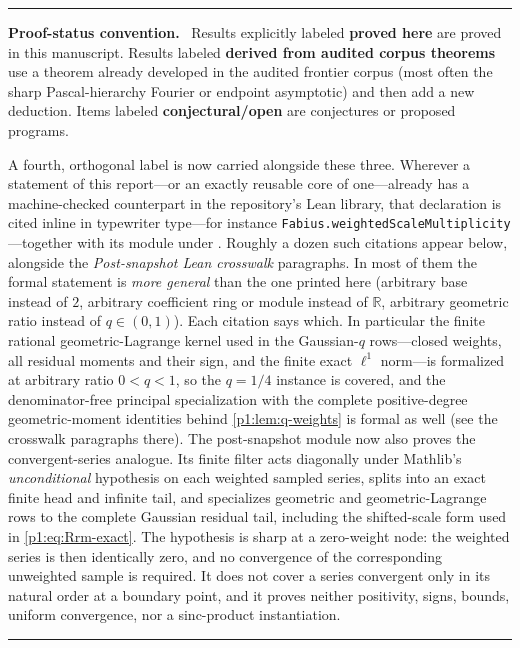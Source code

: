 \documentclass[11pt,oneside]{article}
\numberwithin{equation}{section}
\theoremstyle{definition}
\theoremstyle{remark}
\newcommand{\R}{\mathbb R}
\newcommand{\statusproved}{\textcolor{deepgreen}{\textbf{proved here}}}
\newcommand{\statusderived}{\textcolor{linkblue}{\textbf{derived from audited corpus theorems}}}
\newcommand{\statusopen}{\textcolor{deepred}{\textbf{conjectural/open}}}
\newcommand{\lean}[1]{%
  \ifmmode\text{\texttt{\detokenize{#1}}}\else\nolinkurl{#1}\fi}
\newenvironment{statusbox}[1]{%
  \par\medskip\noindent\begin{center}\begin{minipage}{0.94\textwidth}%
  \color{linkblue}\hrule\vspace{0.65em}%
  \color{black}\textbf{\color{linkblue}#1.}\ }{%
  \par\vspace{0.65em}\color{linkblue}\hrule
  \end{minipage}\end{center}\medskip}
\begin{document}
\begin{statusbox}{Proof-status convention}
Results explicitly labeled \statusproved{} are proved in this manuscript.  Results labeled
\statusderived{} use a theorem already developed in the audited frontier corpus (most often
the sharp Pascal-hierarchy Fourier or endpoint asymptotic) and then add a new deduction.
Items labeled \statusopen{} are conjectures or proposed programs.

A fourth, orthogonal label is now carried alongside these three.  Wherever a statement of this
report---or an exactly reusable core of one---already has a machine-checked counterpart in the
repository's Lean library, that declaration is cited inline in typewriter type---for instance
\lean{Fabius.weightedScaleMultiplicity}---together with its module under
.  Roughly a dozen such citations appear
below, alongside the \emph{Post-snapshot Lean crosswalk} paragraphs.  In most of them the
formal statement is \emph{more general} than the one printed here
(arbitrary base instead of $2$, arbitrary coefficient ring or module instead of $\R$, arbitrary
geometric ratio instead of $q\in(0,1)$).  Each citation says which.  In particular the finite
rational geometric-Lagrange kernel used in the Gaussian-$q$ rows---closed weights, all
residual moments and their sign, and the finite exact $\ell^1$ norm---is formalized at
arbitrary ratio $0<q<1$, so the $q=1/4$ instance is covered, and the denominator-free
principal specialization with the complete positive-degree geometric-moment identities behind
\cref{p1:lem:q-weights} is formal as well (see the crosswalk paragraphs there).
The post-snapshot module  now also proves the
convergent-series analogue.  Its finite filter acts diagonally under Mathlib's
\emph{unconditional}  hypothesis on each weighted sampled series,
splits into an exact finite head and infinite tail, and specializes geometric and
geometric-Lagrange rows to the complete Gaussian residual tail, including the
shifted-scale form used in \eqref{p1:eq:Rrm-exact}.  The hypothesis is sharp at a
zero-weight node: the weighted series is then identically zero, and no convergence
of the corresponding unweighted sample is required.  It does not cover a series
convergent only in its natural order at a boundary point, and it proves neither
positivity, signs, bounds, uniform convergence, nor a sinc-product instantiation.


\end{statusbox}
\end{document}

